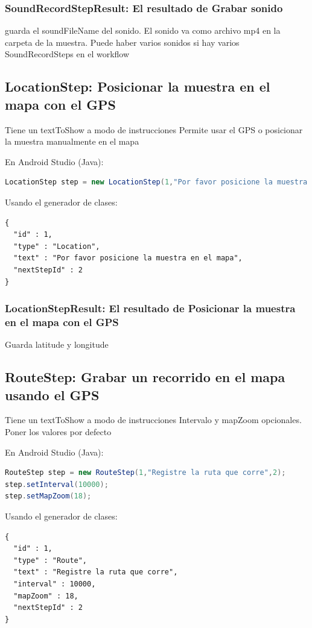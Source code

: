 \subsubsection{SoundRecordStepResult: El resultado de Grabar sonido}
guarda el soundFileName del sonido.
El sonido va como archivo mp4 en la carpeta de la muestra.
Puede haber varios sonidos si hay varios SoundRecordSteps en el workflow


\subsection{LocationStep: Posicionar la muestra en el mapa con el GPS}
Tiene un textToShow a modo de instrucciones
Permite usar el GPS o posicionar la muestra manualmente en el mapa

En Android Studio (Java):
\begin{lstlisting}[language=Java, frame=tlb]	
LocationStep step = new LocationStep(1,"Por favor posicione la muestra en el mapa",2); 
\end{lstlisting}

Usando el generador de clases:
\begin{lstlisting}[language=XML, frame=tlb]	
{
  "id" : 1,
  "type" : "Location",
  "text" : "Por favor posicione la muestra en el mapa",
  "nextStepId" : 2
}
\end{lstlisting}

\subsubsection{LocationStepResult: El resultado de Posicionar la muestra en el mapa con el GPS}
Guarda latitude y longitude

\subsection{RouteStep: Grabar un recorrido en el mapa usando el GPS}
Tiene un textToShow a modo de instrucciones
Intervalo y mapZoom opcionales. Poner los valores por defecto

En Android Studio (Java):
\begin{lstlisting}[language=Java, frame=tlb]	
RouteStep step = new RouteStep(1,"Registre la ruta que corre",2); 
step.setInterval(10000);
step.setMapZoom(18);
\end{lstlisting}

Usando el generador de clases:
\begin{lstlisting}[language=XML, frame=tlb]	
{
  "id" : 1,
  "type" : "Route",
  "text" : "Registre la ruta que corre",
  "interval" : 10000,
  "mapZoom" : 18,
  "nextStepId" : 2
}
\end{lstlisting}

